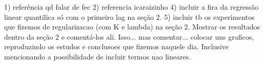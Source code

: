 1) referência qd falar de fec
2) referencia icaraizinho
4) incluir a fira da regressão linear quantilica só com o primeiro lag na seção 2. 
5) incluir tb os experimentos que fizemos de regularizacao (com K e lambda) na seção 2. Mostrar os resultados dentro da seção 2 e comentá-los ali. 
Isso... mas comentar... colocar uns graficos, reproduzindo os estudos e conclusoes que fizemos naquele dia. Inclusive mencionando a possibilidade de incluir termos nao lineares.
\label{key}